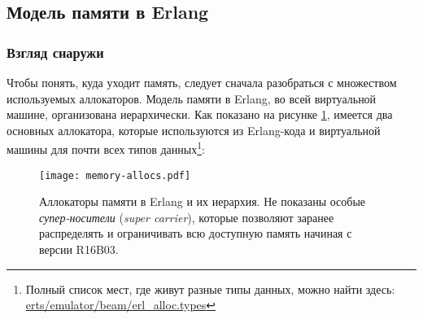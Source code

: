 \subsection{Модель памяти в Erlang}
\label{subsec:erlang-memory-model}

\subsubsection{Взгляд снаружи}

Чтобы понять, куда уходит память, следует сначала разобраться с множеством используемых аллокаторов. Модель памяти в Erlang, во всей виртуальной машине, организована иерархически. Как показано на рисунке \ref{fig:allocators}, имеется два основных аллокатора, которые используются из Erlang-кода и виртуальной машины для почти всех типов данных\footnote{Полный список мест, где живут разные типы данных, можно найти здесь: \href{https://github.com/erlang/otp/blob/maint/erts/emulator/beam/erl\_alloc.types}{erts/emulator/beam/erl\_alloc.types}}:


\begin{figure}
  \texttt{[image: memory-allocs.pdf]}%
	\caption{Аллокаторы памяти в Erlang и их иерархия. Не показаны особые \emph{супер-носители} (\emph{super carrier}), которые позволяют заранее распределять и ограничивать всю доступную память начиная с версии R16B03.}
   \label{fig:allocators}
\end{figure}

